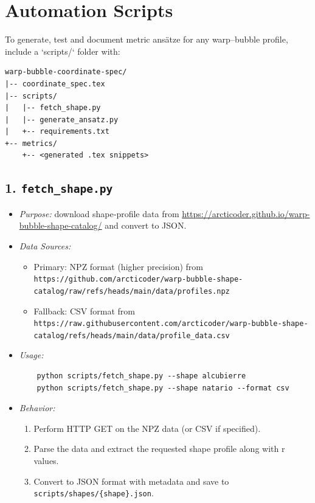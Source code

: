 \documentclass[11pt]{article}
\begin{document}
\section{Automation Scripts}
To generate, test and document metric ansätze for any warp–bubble profile, include a `scripts/` folder with:

\begin{verbatim}
warp-bubble-coordinate-spec/
|-- coordinate_spec.tex
|-- scripts/
|   |-- fetch_shape.py
|   |-- generate_ansatz.py
|   +-- requirements.txt
+-- metrics/
    +-- <generated .tex snippets>
\end{verbatim}

\subsection*{1. \texttt{fetch_shape.py}}
\begin{itemize}
  \item \emph{Purpose:} download shape‐profile data from
    \url{https://arcticoder.github.io/warp-bubble-shape-catalog/} and convert to JSON.
  \item \emph{Data Sources:}
    \begin{itemize}
      \item Primary: NPZ format (higher precision) from\\
        \verb|https://github.com/arcticoder/warp-bubble-shape-catalog/raw/refs/heads/main/data/profiles.npz|
      \item Fallback: CSV format from\\
        \verb|https://raw.githubusercontent.com/arcticoder/warp-bubble-shape-catalog/refs/heads/main/data/profile_data.csv|
    \end{itemize}
  \item \emph{Usage:}
    \begin{verbatim}
    python scripts/fetch_shape.py --shape alcubierre
    python scripts/fetch_shape.py --shape natario --format csv
    \end{verbatim}
  \item \emph{Behavior:}
    \begin{enumerate}
      \item Perform HTTP GET on the NPZ data (or CSV if specified).
      \item Parse the data and extract the requested shape profile along with r values.
      \item Convert to JSON format with metadata and save to \verb|scripts/shapes/{shape}.json|.
    \end{enumerate}
\end{itemize}
\end{document}
